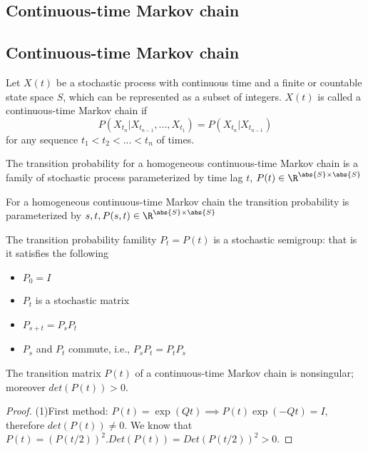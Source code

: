 \begin{refsection}
\startcontents[chapters]	
\chapter{Continuous-time Markov chain}\label{ch:continuous-time-markov-chain}
{}
\section{Continuous-time Markov chain}
\begin{definition}
Let $X(t)$ be a stochastic process with continuous time and a finite or countable state space $S$, which can be represented as a subset of integers. $X(t)$ is called a continuous-time Markov chain if $$P(X_{t_n}|X_{t_{n-1}},...,X_{t_{1}}) = P(X_{t_n}|X_{t_{n-1}})$$
for any sequence $t_1 < t_2 < ...< t_n$ of times.
\end{definition}

\begin{definition}
The transition probability for a homogeneous continuous-time Markov chain is a family of stochastic process parameterized by time lag $t$, $P(t) \in \R^{\abs{S}\times \abs{S}}$
\end{definition}

\begin{remark}
For a homogeneous continuous-time Markov chain the transition probability is parameterized by $s,t, P(s,t) \in \R^{\abs{S}\times \abs{S}}$
\end{remark}

\begin{theorem}
The transition probability famility $P_t= P(t)$ is a stochastic semigroup: that is it satisfies the following
\begin{itemize}
    \item $P_0 = I$
    \item $P_t$ is a stochastic matrix
    \item $P_{s+t}=P_sP_t$
    \item $P_s$ and $P_t$ commute, i.e., $P_sP_t = P_tP_s$
\end{itemize}
\end{theorem}

\begin{lemma}
	The transition matrix $P(t)$ of a continuous-time Markov chain is nonsingular; moreover $det(P(t)) > 0$.
\end{lemma}
\begin{proof}
(1)First method: $P(t) = \exp(Qt) \implies P(t)\exp(-Qt) = I$, therefore $det(P(t))\neq 0$. We know that $P(t) = (P(t/2))^2. Det(P(t)) = Det(P(t/2))^2 > 0$.
\end{proof}





\end{refsection}
